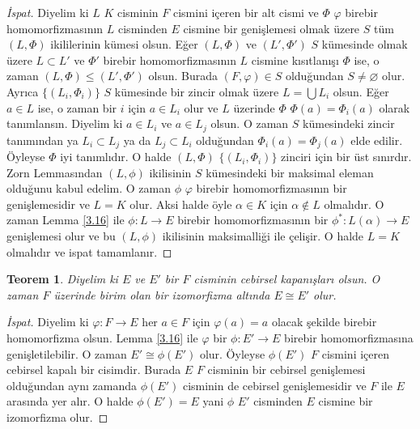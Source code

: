 \documentclass{article}
\newtheorem{thm}{Teorem}[section]
\theoremstyle{definition}
\theoremstyle{remark}
\begin{document}
            \begin{proof}[İspat]
                Diyelim ki $L$ $K$ cisminin $F$ cismini içeren bir alt cismi ve $\Phi$ $\varphi$ birebir homomorfizmasının $L$ cisminden $E$ cismine bir genişlemesi olmak üzere $S$ tüm $(L, \Phi)$ ikililerinin kümesi olsun. Eğer $(L, \Phi)$ ve $(L', \Phi')$ $S$ kümesinde olmak üzere $L \subset L'$ ve $\Phi'$ birebir homomorfizmasının $L$ cismine kısıtlanışı $\Phi$ ise, o zaman $(L, \Phi) \leq (L', \Phi')$ olsun. Burada $(F, \varphi) \in S$ olduğundan $S \neq \varnothing$ olur. Ayrıca $\{(L_i, \Phi_i)\}$ $S$ kümesinde bir zincir olmak üzere $L = \bigcup L_i$ olsun. Eğer $a \in L$ ise, o zaman bir $i$ için $a \in L_i$ olur ve $L$ üzerinde $\Phi$ $\Phi(a) = \Phi_i(a)$ olarak tanımlansın. Diyelim ki $a \in L_i$ ve $a \in L_j$ olsun. O zaman $S$ kümesindeki zincir tanımından ya $L_i \subset L_j$ ya da $L_j \subset L_i$ olduğundan $\Phi_i(a) = \Phi_j(a)$ elde edilir. Öyleyse $\Phi$ iyi tanımlıdır. O halde $(L, \Phi)$ $\{(L_i, \Phi_i)\}$ zinciri için bir üst sınırdır. Zorn Lemmasından $(L, \phi)$ ikilisinin $S$ kümesindeki bir maksimal eleman olduğunu kabul edelim. O zaman $\phi$ $\varphi$ birebir homomorfizmasının bir genişlemesidir ve $L = K$ olur. Aksi halde öyle $\alpha \in K$ için $\alpha \notin L$ olmalıdır. O zaman Lemma \ref{3.16} ile $\phi: L \to E$ birebir homomorfizmasının bir $\phi^{*}: L(\alpha) \to E$ genişlemesi olur ve bu $(L, \phi)$ ikilisinin maksimalliği ile çelişir. O halde $L = K$ olmalıdır ve ispat tamamlanır.
            \end{proof}
            
            \begin{thm}
                Diyelim ki $E$ ve $E'$ bir $F$ cisminin cebirsel kapanışları olsun. O zaman $F$ üzerinde birim olan bir izomorfizma altında $E \cong E'$ olur.
            \end{thm}
            
            \begin{proof}[İspat]
                Diyelim ki $\varphi: F \to E$ her $a \in F$ için $\varphi(a) = a$ olacak şekilde birebir homomorfizma olsun. Lemma \ref{3.16} ile $\varphi$ bir $\phi: E' \to E$ birebir homomorfizmasına genişletilebilir. O zaman $E' \cong \phi(E')$ olur. Öyleyse $\phi(E')$ $F$ cismini içeren cebirsel kapalı bir cisimdir. Burada $E$ $F$ cisminin bir cebirsel genişlemesi olduğundan aynı zamanda $\phi(E')$ cisminin de cebirsel genişlemesidir ve $F$ ile $E$ arasında yer alır. O halde $\phi(E') = E$ yani $\phi$ $E'$ cisminden $E$ cismine bir izomorfizma olur.
            \end{proof}
            
\end{document}
